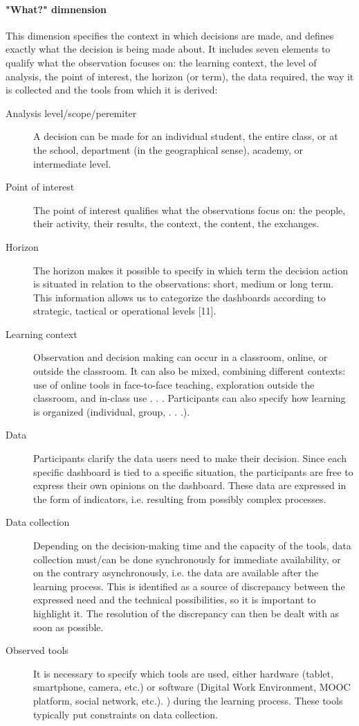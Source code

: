 \documentclass[manuscript,nonacm,12pt]{acmart}
\begin{document}
\paragraph{"What?" dimnension}
This dimension specifies the context in which decisions are made, and defines exactly what the decision is being made about. It includes seven elements to qualify what the observation focuses on: the learning context, the level of analysis, the point of interest, the horizon (or term), the data required, the way it is collected and the tools from which it is derived:
\begin{description}
    \item[Analysis level/scope/peremiter] A decision can be made for an individual student, the entire class, or at the school, department (in the geographical sense), academy, or intermediate level.
    \item[Point of interest] The point of interest qualifies what the observations focus on: the people, their activity, their results, the context, the content, the exchanges.
    \item[Horizon]  The horizon makes it possible to specify in which term the decision action is situated in relation to the observations: short, medium or long term. This information allows us to categorize the dashboards according to strategic, tactical or operational levels [11].
    \item[Learning context] Observation and decision making can occur in a classroom, online, or outside the classroom. It can also be mixed, combining different contexts: use of online tools in face-to-face teaching, exploration outside the classroom, and in-class use . . . Participants can also specify how learning is organized (individual, group, . . .).
    \item[Data]  Participants clarify the data users need to make their decision. Since each specific dashboard is tied to a specific situation, the participants are free to express their own opinions on the dashboard. These data are expressed in the form of indicators, i.e. resulting from possibly complex processes.
    \item[Data collection] Depending on the decision-making time and the capacity of the tools, data collection must/can be done synchronously for immediate availability, or on the contrary asynchronously, i.e. the data are available after the learning process. This is identified as a source of discrepancy between the expressed need and the technical possibilities, so it is important to highlight it. The resolution of the discrepancy can then be dealt with as soon as possible.
    \item[Observed tools] It is necessary to specify which tools are used, either hardware (tablet, smartphone, camera, etc.) or software (Digital Work Environment, MOOC platform, social network, etc.). ) during the learning process. These tools typically put constraints on data collection. 
\end{description}
\end{document}
